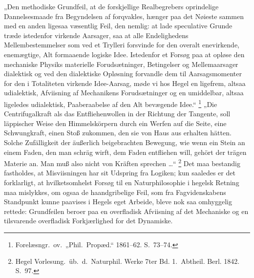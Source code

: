 \documentclass[12pt]{book}
\newcommand{\opage}[1]{\marginnote{\footnotesize\textit{[#1]}}}
\begin{document}
„Den methodiske Grundfeil, at de forskjellige Realbegrebers oprindelige Dannelsesmaade fra
Begyndelsen af forqvakles, hænger paa det Nøieste sammen med en anden ligesaa væsentlig
Feil, den nemlig: at lade speculative Grunde træde istedenfor virkende Aarsager, saa at
alle Endelighedens Mellembestemmelser som ved et Trylleri forsvinde for den overalt
enevirkende, enemægtige, Alt formaaende logiske Idee. Istedenfor et Forsøg paa at opløse
den mechaniske Physiks materielle Forudsætninger, Betingelser og Mellemaarsager dialektisk
og ved den dialektiske Opløsning forvandle dem til Aarsagsmomenter for den i Totaliteten
virkende Idee-Aarsag, møde vi hos Hegel en ligefrem, altsaa udialektisk, Afviisning af
Mechanikens Forudsætninger og en umiddelbar, altsaa ligeledes udialektisk, Paaberaabelse af
den Alt bevægende Idee.“%
\footnote{Forelæsngr.\ ov.\ „Phil.\ Propæd.“ 1861--62. S.~73--74.}
„Die Centrifugalkraft als das Entfliehenwollen in der Richtung der Tangente, soll
läppischer Weise den Himmelskörpern durch ein Werfen auf die Seite, eine Schwungkraft,
einen Stoß zukommen, den sie von Haus aus erhalten hätten. Solche Zufälligkeit der
äußerlich beigebrachten Bewegung, wie wenn ein Stein an einem Faden, den man schräg wirft,
dem Faden entfliehen will, gehört der trägen Materie an. Man muß also nicht von Kräften
sprechen \ldots“%
\footnote{Hegel Vorlesung.\ üb.\ d.\ Naturphil. Werke 7ter Bd. 1.\ Abtheil. Berl. 1842. S.~97.}
Det maa bestandig fastholdes, at Misviisningen har sit Udspring fra Logiken; kun saaledes
er det forklarligt, at hvilketsomhelst Forsøg til en Naturphilosophie i hegelsk Retning maa
mislykkes, om ogsaa de haandgribelige Feil, som fra Fagvidenskabens Standpunkt kunne
paavises i Hegels eget Arbeide, bleve nok saa omhyggelig rettede: Grundfeilen beroer
\opage{357} paa en overfladisk Afviisning af det Mechaniske og en tilsvarende overfladisk Forkjærlighed
for det Dynamiske.
\end{document}

